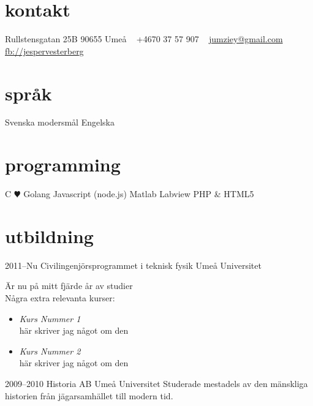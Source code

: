 \documentclass[]{friggeri-cv} %
\begin{document}


\begin{aside} %
\section{kontakt}
Rullstensgatan 25B
90655 Umeå
~
+4670 37 57 907
~
\href{mailto:jumziey@gmail.com}{jumziey@gmail.com}
\href{https://www.facebook.com/jesper.vesterberlg}{fb://jespervesterberg}
\section{språk}
Svenska modersmål
Engelska 
\section{programming}
C{\color{red} $\varheartsuit$}
Golang
Javascript (node.js)
Matlab
Labview
PHP \& HTML5
\end{aside}


\section{utbildning}

\begin{entrylist}
\entry
{2011--Nu}
{Civilingenjörsprogrammet {\normalfont i teknisk fysik}}
{Umeå Universitet}
{Är nu på mitt fjärde år av studier\\
Några extra relevanta kurser: 
\begin{itemize}
\item \emph{Kurs Nummer 1} \\
	här skriver jag något om den
\item \emph{Kurs Nummer 2} \\
	här skriver jag något om den 
\end{itemize}
}
\entry
{2009--2010}
{Historia {\normalfont AB}}
{Umeå Universitet}
{Studerade mestadels av den mänskliga historien från jägarsamhället till modern tid.}
\end{entrylist}
\end{document}
